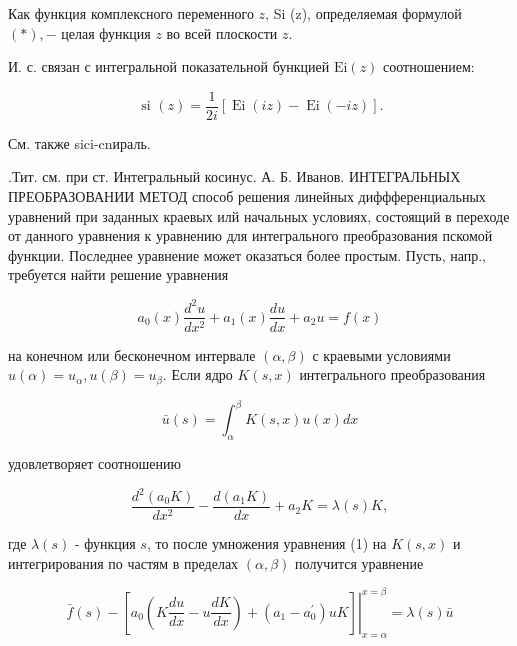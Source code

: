 \documentclass[10pt]{article}
\begin{document}
Как функция комплексного переменного $z$, Si (z), определяемая формулой $(*),-$ целая функция $z$ во всей плоскости $z$.



И. с. связан с интегральной показательной бункцией $\mathrm{Ei}(z)$ соотношением:



\[

\text { si }(z)=\frac{1}{2 i}[\operatorname{Ei}(i z)-\operatorname{Ei}(-i z)] .

\]



См. также sici-cnираль.



.Тит. см. при ст. Интегральный косинус. А. Б. Иванов. ИНТЕГРАЛЬНЫХ ПРЕОБРАЗОВАНИИ МЕТОД способ решения линейных диффференциальных уравнений при заданных краевых илй начальных условиях, состоящий в переходе от данного уравнения к уравнению для интегрального преобразования пскомой функции. Последнее уравнение может оказаться более простым. Пусть, напр., требуется найти решение уравнения



\[

a_{0}(x) \frac{d^{2} u}{d x^{2}}+a_{1}(x) \frac{d u}{d x}+a_{2} u=f(x)

\]



на конечном или бесконечном интервале $(\alpha, \beta)$ с краевыми условиями $u(\alpha)=u_{\alpha}, u(\beta)=u_{\beta}$. Если ядро $K(s, x)$ интегрального преобразования



\[

\bar{u}(s)=\int_{\alpha}^{\beta} K(s, x) u(x) d x

\]



удовлетворяет соотношению



\[

\frac{d^{2}\left(a_{0} K\right)}{d x^{2}}-\frac{d\left(a_{1} K\right)}{d x}+a_{2} K=\lambda(s) K,

\]



где $\lambda(s)$ - функция $s$, то после умножения уравнения (1) на $K(s, x)$ и интегрирования по частям в пределах $(\alpha, \beta)$ получится уравнение



\[

\bar{f}(s)-\left.\left[a_{0}\left(K \frac{d u}{d x}-u \frac{d K}{d x}\right)+\left(a_{1}-a_{0}^{\prime}\right) u K\right]\right|_{x=\alpha} ^{x=\beta}=\lambda(s) \bar{u}

\]
\end{document}
